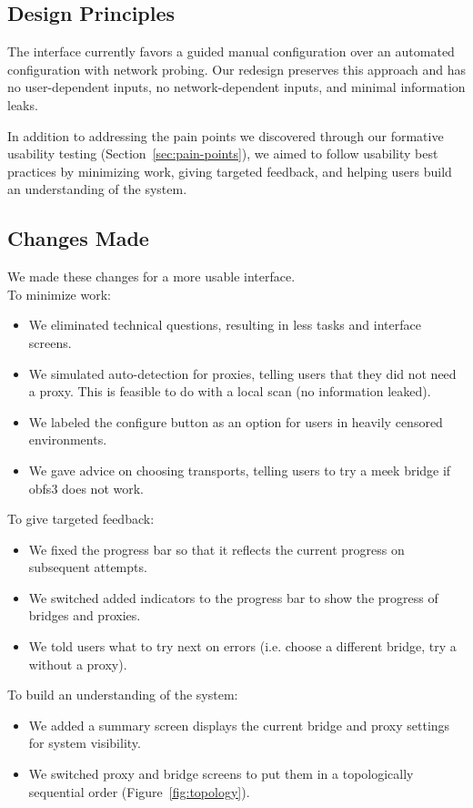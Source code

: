 \documentclass[USenglish,oneside,twocolumn]{article}
\begin{document}
\subsection{Design Principles} 
The interface currently favors a guided manual configuration over an automated configuration with network probing. Our redesign preserves this approach and has no user-dependent inputs, no network-dependent inputs, and minimal information leaks.

In addition to addressing the pain points we discovered through our formative usability testing (Section~\ref{sec:pain-points}), we aimed to follow usability best practices by minimizing work, giving targeted feedback, and helping users build an understanding of the system.

\subsection{Changes Made} 
We made these changes for a more usable interface. \\

\noindent To minimize work: 
\begin{itemize}
\item We eliminated technical questions, resulting in less tasks and interface screens. 
\item We simulated auto-detection for proxies, telling users that they did not need a proxy. This is feasible to do with a local scan (no information leaked). 
\item We labeled the configure button as an option for users in heavily censored environments.
\item We gave advice on choosing transports, telling users to try a meek bridge if obfs3 does not work.
\end{itemize} 

To give targeted feedback: 
\begin{itemize}
\item We fixed the progress bar so that it reflects the current progress on subsequent attempts. 
\item We switched added indicators to the progress bar to show the progress of bridges and proxies. 
\item We told users what to try next on errors (i.e. choose a different bridge, try a without a proxy). 
\end{itemize}

To build an understanding of the system:
\begin{itemize}
\item We added a summary screen displays the current bridge and proxy settings for system visibility. 
\item We switched proxy and bridge screens to put them in a topologically sequential order (Figure~\ref{fig:topology}).
\end{itemize}
\end{document}
